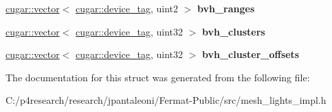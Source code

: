 \begin{DoxyCompactItemize}
\hyperlink{structcugar_1_1vector}{cugar\+::vector}$<$ \hyperlink{structcugar_1_1device__tag}{cugar\+::device\+\_\+tag}, uint2 $>$ {\bfseries bvh\+\_\+ranges}
\item 
\mbox{\label{struct_mesh_v_t_l_storage_impl_a20e0a7c569c421795d1b7e3f81968580}} 
\hyperlink{structcugar_1_1vector}{cugar\+::vector}$<$ \hyperlink{structcugar_1_1device__tag}{cugar\+::device\+\_\+tag}, uint32 $>$ {\bfseries bvh\+\_\+clusters}
\item 
\mbox{\label{struct_mesh_v_t_l_storage_impl_a86a8ffd0e3efe6382b266d133f681022}} 
\hyperlink{structcugar_1_1vector}{cugar\+::vector}$<$ \hyperlink{structcugar_1_1device__tag}{cugar\+::device\+\_\+tag}, uint32 $>$ {\bfseries bvh\+\_\+cluster\+\_\+offsets}
\end{DoxyCompactItemize}


The documentation for this struct was generated from the following file\+:\begin{DoxyCompactItemize}
\item 
C\+:/p4research/research/jpantaleoni/\+Fermat-\/\+Public/src/mesh\+\_\+lights\+\_\+impl.\+h\end{DoxyCompactItemize}
